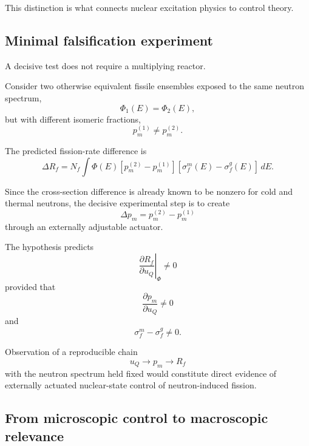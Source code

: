 This distinction is what connects nuclear excitation physics to control theory.

\subsection{Minimal falsification experiment}

A decisive test does not require a multiplying reactor.

Consider two otherwise equivalent fissile ensembles exposed to the same neutron spectrum,
\begin{equation}
\Phi_1(E)=\Phi_2(E),
\end{equation}
but with different isomeric fractions,
\begin{equation}
p_m^{(1)}
\neq
p_m^{(2)}.
\end{equation}

The predicted fission-rate difference is
\begin{equation}
\Delta R_f
=
N_f
\int
\Phi(E)
\left[
p_m^{(2)}-p_m^{(1)}
\right]
\left[
\sigma_f^m(E)-\sigma_f^g(E)
\right]
\,dE.
\label{eq:u235_experiment}
\end{equation}

Since the cross-section difference is already known to be nonzero for cold and thermal neutrons, the decisive experimental step is to create
\begin{equation}
\Delta p_m
=
p_m^{(2)}-p_m^{(1)}
\end{equation}
through an externally adjustable actuator.

The hypothesis predicts
\begin{equation}
\boxed{
\left.
\frac{\partial R_f}
{\partial u_Q}
\right|_{\Phi}
\neq0
}
\end{equation}
provided that
\begin{equation}
\frac{\partial p_m}{\partial u_Q}\neq0
\end{equation}
and
\begin{equation}
\sigma_f^m-\sigma_f^g\neq0.
\end{equation}

Observation of a reproducible chain
\begin{equation}
u_Q
\rightarrow
p_m
\rightarrow
R_f
\end{equation}
with the neutron spectrum held fixed would constitute direct evidence of externally actuated nuclear-state control of neutron-induced fission.

\subsection{From microscopic control to macroscopic relevance}

